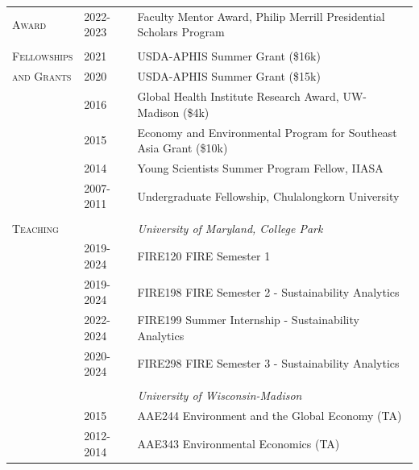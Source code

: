 \documentclass[letterpaper,11pt,oneside]{article}\usepackage[]{graphicx}\usepackage[]{xcolor}
\begin{document}
\noindent \begin{tabular}{p{1.2in} p{0.9in} l}     
\textsc{Award} & 2022-2023 & Faculty Mentor Award, Philip Merrill Presidential Scholars Program \\	
               & & \\
\textsc{Fellowships}	& 2021				& USDA-APHIS Summer Grant (\$16k) \\
\textsc{and Grants }	& 2020				& USDA-APHIS Summer Grant (\$15k) \\
                    	& 2016				& Global Health Institute Research Award, UW-Madison (\$4k) \\
                    	& 2015				& Economy and Environmental Program for Southeast Asia Grant (\$10k) \\
                    	& 2014				& Young Scientists Summer Program Fellow, IIASA \\
                    	& 2007-2011		& Undergraduate Fellowship, Chulalongkorn University \\
                    	& & \\
                    	
\textsc{Teaching}     & & \textit{University of Maryland, College Park} \\
                      & 2019-2024     & FIRE120 FIRE Semester 1 \\
		                  & 2019-2024     & FIRE198 FIRE Semester 2 - Sustainability Analytics \href{https://github.com/ruangmas/ruangmas.github.io/blob/main/documents/FIRE198.pdf}{\color{blue}{[Syllabus]}}\\
                      & 2022-2024     & FIRE199 Summer Internship - Sustainability Analytics \href{https://github.com/ruangmas/ruangmas.github.io/blob/main/documents/FIRE199.pdf}{\color{blue}{[Syllabus]}}\\
				              & 2020-2024	    & FIRE298 FIRE Semester 3 - Sustainability Analytics \href{https://github.com/ruangmas/ruangmas.github.io/blob/main/documents/FIRE298.pdf}{\color{blue}{[Syllabus]}}\\ 
				              & & \\
                      &               & \textit{University of Wisconsin-Madison} \\
				              & 2015          & AAE244 Environment and the Global Economy (TA) \\
				              & 2012-2014     & AAE343 Environmental Economics (TA)\\				              
\end{tabular}
                    	
\end{document}
